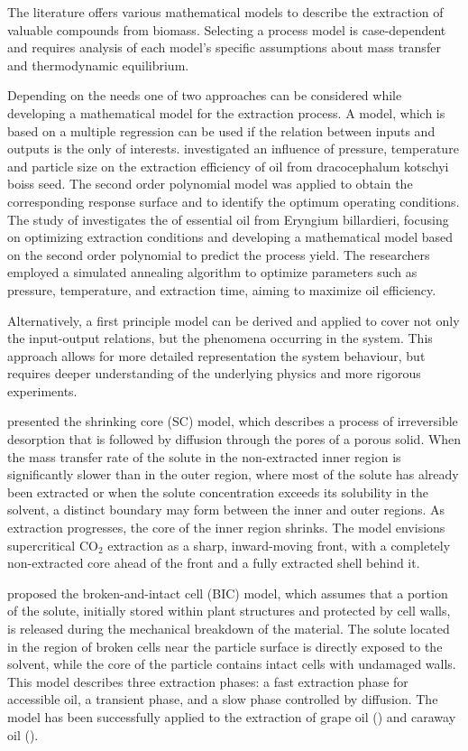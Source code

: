 \documentclass[a4paper,fleqn]{cas-dc}
\begin{document}
	The literature offers various mathematical models to describe the extraction of valuable compounds from biomass. Selecting a process model is case-dependent and requires analysis of each model's specific assumptions about mass transfer and thermodynamic equilibrium.
	
	Depending on the needs one of two approaches can be considered while developing a mathematical model for the extraction process. A model, which is based on a multiple regression can be used if the relation between inputs and outputs is the only of interests. \citet{Sodeifian2017a} investigated an influence of pressure, temperature and particle size on the extraction efficiency of oil from dracocephalum kotschyi boiss seed. The second order polynomial model was applied to obtain the corresponding response surface and to identify the optimum operating conditions. 
	The study of \citet{Sodeifian2017b} investigates the of essential oil from Eryngium billardieri, focusing on optimizing extraction conditions and developing a mathematical model based on the second order polynomial to predict the process yield. The researchers employed a simulated annealing algorithm to optimize parameters such as pressure, temperature, and extraction time, aiming to maximize oil efficiency.
	
	Alternatively, a first principle model can be derived and applied to cover not only the input-output relations, but the phenomena occurring in the system. This approach allows for more detailed representation the system behaviour, but requires deeper understanding of the underlying physics and more rigorous experiments.
	
	\citet{Goto1996} presented the shrinking core (SC) model, which describes a process of irreversible desorption that is followed by diffusion through the pores of a porous solid. When the mass transfer rate of the solute in the non-extracted inner region is significantly slower than in the outer region, where most of the solute has already been extracted or when the solute concentration exceeds its solubility in the solvent, a distinct boundary may form between the inner and outer regions. As extraction progresses, the core of the inner region shrinks. The model envisions supercritical CO$_2$ extraction as a sharp, inward-moving front, with a completely non-extracted core ahead of the front and a fully extracted shell behind it.
	
	\citet{Sovova1994} proposed the broken-and-intact cell (BIC) model, which assumes that a portion of the solute, initially stored within plant structures and protected by cell walls, is released during the mechanical breakdown of the material. The solute located in the region of broken cells near the particle surface is directly exposed to the solvent, while the core of the particle contains intact cells with undamaged walls. This model describes three extraction phases: a fast extraction phase for accessible oil, a transient phase, and a slow phase controlled by diffusion. The model has been successfully applied to the extraction of grape oil (\citet{Sovova1994b}) and caraway oil (\citet{Sovova1994a}).
	
\end{document}
